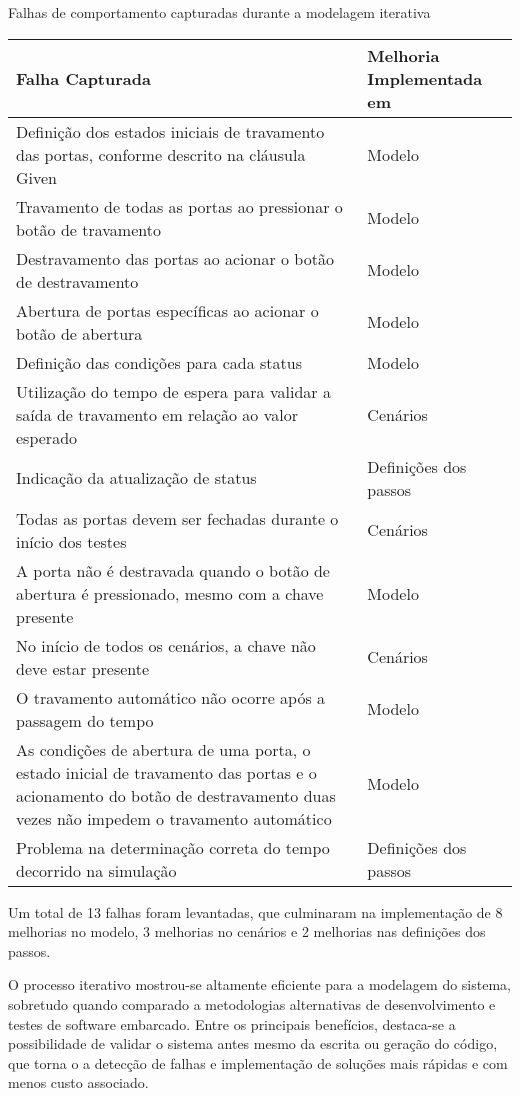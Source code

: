 \begin{quadro}[H]
\caption{Falhas de comportamento capturadas durante a modelagem iterativa}
\label{qua:falhas}
\begin{tabular}{|p{7cm}|p{5cm}|}
\hline
Falha Capturada & Melhoria Implementada em \\ 
\hline
Definição dos estados iniciais de travamento das portas, conforme descrito na cláusula Given & Modelo \\
\hline
Travamento de todas as portas ao pressionar o botão de travamento & Modelo \\
\hline
Destravamento das portas ao acionar o botão de destravamento & Modelo \\
\hline
Abertura de portas específicas ao acionar o botão de abertura & Modelo \\
\hline
Definição das condições para cada status & Modelo \\
\hline
Utilização do tempo de espera para validar a saída de travamento em relação ao valor esperado & Cenários \\
\hline
Indicação da atualização de status & Definições dos passos \\
\hline
Todas as portas devem ser fechadas durante o início dos testes & Cenários \\
\hline
A porta não é destravada quando o botão de abertura é pressionado, mesmo com a chave presente & Modelo \\
\hline
No início de todos os cenários, a chave não deve estar presente & Cenários \\
\hline
O travamento automático não ocorre após a passagem do tempo & Modelo \\
\hline
As condições de abertura de uma porta, o estado inicial de travamento das portas e o acionamento do botão de destravamento duas vezes não impedem o travamento automático & Modelo \\
\hline
Problema na determinação correta do tempo decorrido na simulação & Definições dos passos  \\
\hline
\end{tabular}
\end{quadro}

Um total de 13 falhas foram levantadas, que culminaram na implementação de 8 melhorias no modelo, 3 melhorias no cenários e 2 melhorias nas definições dos passos. 

O processo iterativo mostrou-se altamente eficiente para a modelagem do sistema, sobretudo quando comparado a metodologias alternativas de desenvolvimento e testes 
de software embarcado. Entre os principais benefícios, destaca-se a possibilidade de validar o sistema antes mesmo da escrita ou geração do código, que torna o 
a detecção de falhas e implementação de soluções mais rápidas e com menos custo associado.

